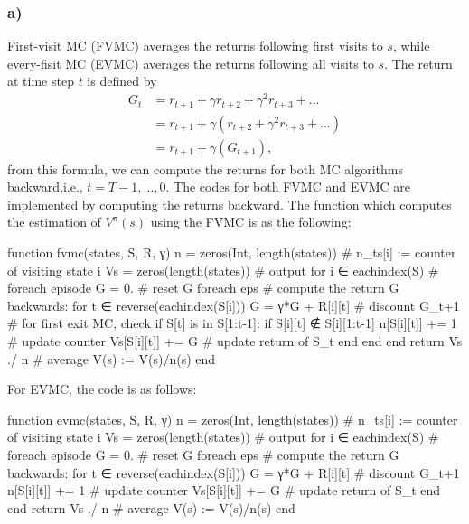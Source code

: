 \documentclass[12pt]{article}
\begin{document}
\subsubsection*{a)}
First-visit MC (FVMC) averages the returns following first visits to $s$, while every-fisit MC (EVMC) averages the returns following all visits to $s$. The return at time step $t$ is defined by
\begin{equation}
    \begin{split}
        G_t &= r_{t+1} + \gamma r_{t+2} + \gamma^2 r_{t+3} + ... \\
            &= r_{t+1} +\gamma(r_{t+2} + \gamma^2 r_{t+3} + ...) \\
            &= r_{t+1} +\gamma(G_{t+1}),
    \end{split}
\end{equation}
from this formula, we can compute the returns for both MC algorithms backward,i.e., $t=T-1,...,0$. 
The codes for both FVMC and EVMC are implemented by computing the returns backward. 
The function which computes the estimation of $V^{\pi}(s)$ using the FVMC is as the following:
\begin{jllisting}
    function fvmc(states, S, R, γ)
        n = zeros(Int, length(states)) # n_ts[i] := counter of visiting state i
        Vs = zeros(length(states)) # output
        for i ∈ eachindex(S) # foreach episode
            G = 0. # reset G foreach eps
            # compute the return G backwards:
            for t ∈ reverse(eachindex(S[i]))
                G = γ*G + R[i][t] # discount G_{t+1}
                # for first exit MC, check if S[t] is in S[1:t-1]:
                if S[i][t] ∉ S[i][1:t-1]
                    n[S[i][t]] += 1 # update counter
                    Vs[S[i][t]] += G # update return of S_t
                end
            end
        end
        return Vs ./ n # average V(s) := V(s)/n(s)
    end
\end{jllisting}
For EVMC, the code is as follows:
\begin{jllisting}
    function evmc(states, S, R, γ)
        n = zeros(Int, length(states)) # n_ts[i] := counter of visiting state i
        Vs = zeros(length(states)) # output
        for i ∈ eachindex(S) # foreach episode
            G = 0. # reset G foreach eps
            # compute the return G backwards:
            for t ∈ reverse(eachindex(S[i]))
                G = γ*G + R[i][t] # discount G_{t+1}
                n[S[i][t]] += 1 # update counter
                Vs[S[i][t]] += G # update return of S_t
            end
        end
        return Vs ./ n # average V(s) := V(s)/n(s)
    end
\end{jllisting}
\end{document}
